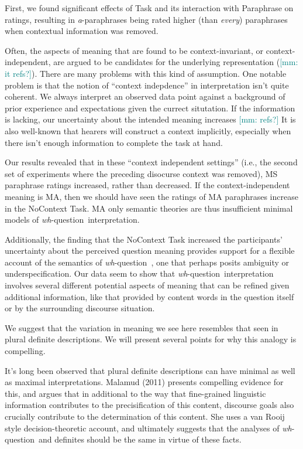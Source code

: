 \documentclass[12pt,letterpaper,table,svgnames,dvipsnames]{article}
\newcommand{\mm}[1]{\textcolor{teal}{[mm: #1]}}
\newcommand{\whq}{\emph{wh}-question~}
\begin{document}
First, we found significant effects of Task and its interaction with Paraphrase on ratings, resulting in \emph{a}-paraphrases being rated higher (than \emph{every}) paraphrases when contextual information was removed.

Often, the aspects of meaning that are found to be context-invariant, or context-independent, are argued to be candidates for the underlying representation (\mm{it refs?}). There are many problems with this kind of assumption. One notable problem is that the notion of ``context indepdence'' in interpretation isn't quite coherent. We always interpret an observed data point against a background of prior experience and expectations given the currect situtation. If the information is lacking, our uncertainty about the intended meaning increases 
\mm{refs?}
It is also well-known that hearers will construct a context implicitly, especially when there isn't enough information to complete the task at hand.


Our results revealed that in these ``context independent settings'' (i.e., the second set of experiments where the preceding disocurse context was removed), MS paraphrase ratings increased, rather than decreased. If the context-independent meaning is MA, then we should have seen the ratings of MA paraphrases increase in the NoContext Task. MA only semantic theories are thus insufficient minimal models of \whq interpretation. 


Additionally, the finding that the NoContext Task increased the participants' uncertainty about the perceived question meaning provides support for a flexible account of the semantics of \whq, one that perhaps posits ambiguity or underspecification. Our data seem to show that \whq interpretation involves several different potential aspects of meaning that can be refined given additional information, like that provided by content words in the question itself or by the surrounding discourse situation. 

We suggest that the variation in meaning we see here resembles that seen in plural definite descriptions. We will present several points for why this analogy is compelling.

It's long been observed that plural definite descriptions can have minimal as well as maximal interpretations. Malamud (2011) presents compelling evidence for this, and argues that in additional to the way that fine-grained linguistic information contributes to the precisification of this content, discourse goals also crucially contribute to the determination of this content. She uses a van Rooij style decision-theoretic account, and ultimately suggests that the analyses of \whq and definites should be the same in virtue of these facts.
\end{document}
